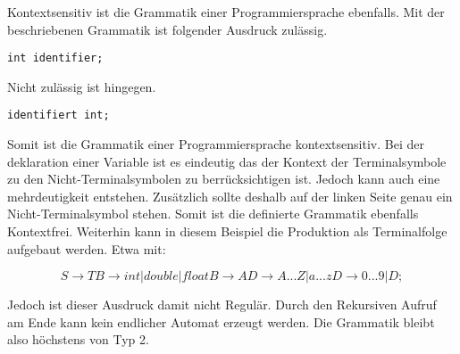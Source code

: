 Kontextsensitiv ist die Grammatik einer Programmiersprache ebenfalls. Mit der beschriebenen Grammatik ist folgender Ausdruck zulässig.
\begin{verbatim}
int identifier;
\end{verbatim}
Nicht zulässig ist hingegen.
\begin{verbatim} 
identifiert int; 
\end{verbatim}
Somit ist die Grammatik einer Programmiersprache kontextsensitiv. 
Bei der deklaration einer Variable ist es eindeutig das der Kontext der Terminalsymbole zu den Nicht-Terminalsymbolen zu berrücksichtigen ist. Jedoch kann auch eine mehrdeutigkeit entstehen. Zusätzlich sollte deshalb auf der linken Seite genau ein Nicht-Terminalsymbol stehen. Somit ist die definierte Grammatik ebenfalls Kontextfrei. 
Weiterhin kann in diesem Beispiel die Produktion als Terminalfolge aufgebaut werden. Etwa mit: 

\begin{center}
\begin{equation}
S \to TB \to int | double | float B \to AD \to A...Z|a...z D \to 0...9|D;
\end{equation}
\end{center}

Jedoch ist dieser Ausdruck damit nicht Regulär. Durch den Rekursiven Aufruf am Ende kann kein endlicher Automat erzeugt werden. Die Grammatik bleibt also höchstens von Typ 2.

	
